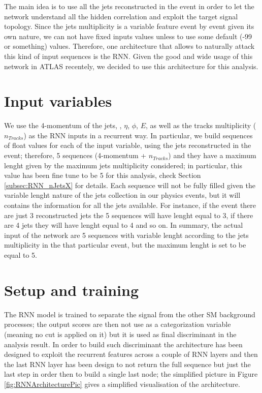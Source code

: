 The main idea is to use all the jets reconstructed in the event in order to let the network understand all the hidden correlation and exploit the target signal topology.
Since the jets multiplicity is a variable feature event by event given its own nature, we can not have fixed inputs values unless to use some default (-99 or something) values. Therefore, one architecture that allows to naturally attack this kind of input sequences is the RNN. Given the good and wide usage of this network in ATLAS recentely, we decided to use this architecture for this analysis.

\section{Input variables}

We use the 4-momentum of the jets, \pt, $\eta$, $\phi$, $E$, as well as the tracks multiplicity ($n_{Tracks}$) as the RNN inputs in a recurrent way.
In particular, we build sequences of float values for each of the input variable, using the jets reconstructed in the event; therefore, 5 sequences (4-momentum + $n_{Tracks}$) and they have a maximum lenght given by the maximum jets multiplicity considered; in particular, this value has been fine tune to be 5 for this analysis, check Section \ref{subsec:RNN_nJetsX} for details. Each sequence will not be fully filled given the variable lenght nature of the jets collection in our physics events, but it will contains the information for all the jets available. For instance, if the event there are just 3 reconstructed jets the 5 sequences will have lenght equal to 3, if there are 4 jets they will have lenght equal to 4 and so on.
In summary, the actual input of the network are 5 sequences with variable lenght according to the jets multiplicity in the that particular event, but the maximum lenght is set to be equal to 5.


\section{Setup and training}

The RNN model is trained to separate the signal from the other SM background processes; the output scores are then not use as a categorization variable (meaning no cut is applied on it) but it is used as final discriminant in the analysis result. In order to build such discriminant the architecture has been designed to exploit the recurrent features across a couple of RNN layers and then the last RNN layer has been design to not return the full sequence but just the last step in order then to build a single last node; the simplified picture in Figure \ref{fig:RNNArchitecturePic} gives a simplified visualisation of the architecture.

